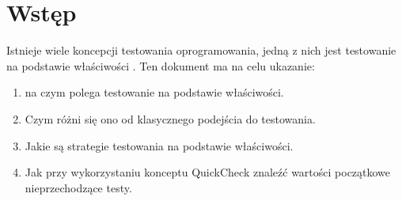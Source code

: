 \section{Wstęp}
Istnieje wiele koncepcji testowania oprogramowania, jedną z nich jest testowanie na podstawie właściwości \cite{pbt_bib}.
Ten dokument ma na celu ukazanie:
\begin{enumerate}
  \item na czym polega testowanie na podstawie właściwości.
  \item Czym różni się ono od klasycznego podejścia do testowania.
  \item Jakie są strategie testowania na podstawie właściwości. 
  \item Jak przy wykorzystaniu konceptu QuickCheck znaleźć wartości początkowe nieprzechodzące testy.
\end{enumerate}
